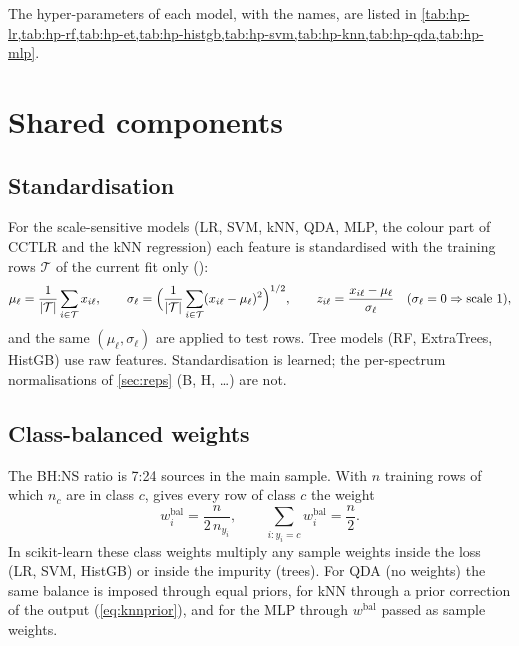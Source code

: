 The hyper-parameters of each model, with the  names, are listed in \cref{tab:hp-lr,tab:hp-rf,tab:hp-et,tab:hp-histgb,tab:hp-svm,tab:hp-knn,tab:hp-qda,tab:hp-mlp}.


\section{Shared components}\label{sec:shared}

\subsection{Standardisation}\label{sec:scaler}
For the scale-sensitive models (LR, SVM, kNN, QDA, MLP, the colour part of CCTLR and the kNN regression) each feature
is standardised with the training rows $\mathcal T$ of the current fit only ():
\begin{equation}
\mu_\ell = \frac{1}{|\mathcal T|}\sum_{i\in\mathcal T}x_{i\ell},\qquad
\sigma_\ell = \Bigl(\frac{1}{|\mathcal T|}\sum_{i\in\mathcal T}(x_{i\ell}-\mu_\ell)^2\Bigr)^{1/2},\qquad
z_{i\ell} = \frac{x_{i\ell}-\mu_\ell}{\sigma_\ell}\quad(\sigma_\ell=0\Rightarrow\text{scale }1),\label{eq:scaler}
\end{equation}
and the same $(\mu_\ell,\sigma_\ell)$ are applied to test rows. Tree models (RF, ExtraTrees, HistGB) use raw features.
Standardisation is learned; the per-spectrum normalisations of \cref{sec:reps} (B, H, \dots) are not.

\subsection{Class-balanced weights}\label{sec:weights}
The BH:NS ratio is 7:24 sources in the main sample. With $n$ training rows of which $n_c$ are in class $c$,
 gives every row of class $c$ the weight
\begin{equation}
w^{\mathrm{bal}}_i = \frac{n}{2\,n_{y_i}},\qquad \sum_{i:y_i=c}w^{\mathrm{bal}}_i = \frac n2 .\label{eq:balanced}
\end{equation}
In scikit-learn these class weights multiply any sample weights inside the loss (LR, SVM, HistGB) or inside the impurity
(trees). For QDA (no weights) the same balance is imposed through equal priors, for kNN through a prior correction of the
output (\cref{eq:knnprior}), and for the MLP through $w^{\mathrm{bal}}$ passed as sample weights.

